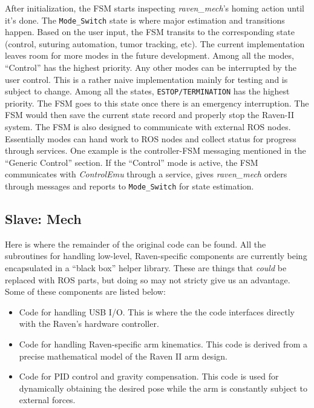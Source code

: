 \documentclass[letterpaper,twocolumn,10pt]{article}
\begin{document}
After initialization, the FSM starts inspecting \emph{raven\_mech}'s
homing action until it's done. The \texttt{Mode\_Switch} state is
where major estimation and transitions happen. Based on the user
input, the FSM transits to the corresponding state (control, suturing
automation, tumor tracking, etc). The current implementation leaves
room for more modes in the future development. Among all the modes,
``Control'' has the highest priority. Any other modes can be
interrupted by the user control. This is a rather naive implementation
mainly for testing and is subject to change. Among all the states,
\texttt{ESTOP/TERMINATION} has the highest priority. The FSM goes to
this state once there is an emergency interruption. The FSM would then
save the current state record and properly stop the Raven-II
system. The FSM is also designed to communicate with external ROS
nodes. Essentially modes can hand work to ROS nodes and collect status
for progress through services. One example is the controller-FSM
messaging mentioned in the ``Generic Control'' section. If the
``Control'' mode is active, the FSM communicates with
\emph{ControlEmu} through a service, gives \emph{raven\_mech} orders
through messages and reports to \texttt{Mode\_Switch} for state
estimation.

\subsection{Slave: Mech}

Here is where the remainder of the original code can be found. All the
subroutines for handling low-level, Raven-specific components are
currently being encapsulated in a ``black box'' helper library. These
are things that \emph{could} be replaced with ROS parts, but doing so
may not stricty give us an advantage. Some of these components are
listed below:

\begin{itemize}
  \item Code for handling USB I/O. This is where the the code
    interfaces directly with the Raven's hardware controller.

  \item Code for handling Raven-specific arm kinematics. This code is
    derived from a precise mathematical model of the Raven II arm
    design.

  \item Code for PID control and gravity compensation. This code is
    used for dynamically obtaining the desired pose while the arm is
    constantly subject to external forces.
\end{itemize}
 
\end{document}

